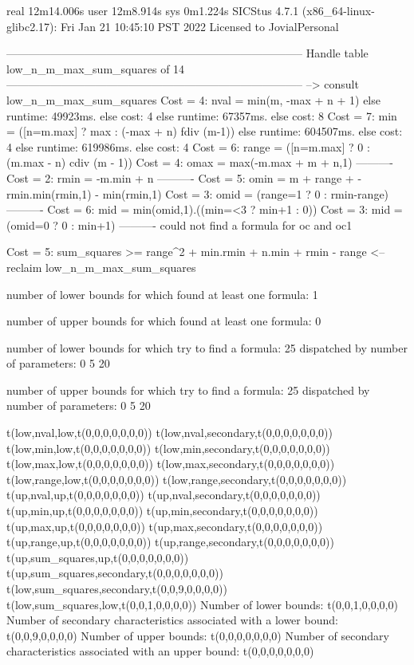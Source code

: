 real	12m14.006s
user	12m8.914s
sys	0m1.224s
SICStus 4.7.1 (x86_64-linux-glibc2.17): Fri Jan 21 10:45:10 PST 2022
Licensed to JovialPersonal


--------------------------------------------------------------------------------
Handle table low_n_m_max_sum_squares of 14
--------------------------------------------------------------------------------
--> consult low_n_m_max_sum_squares
Cost =  4:  nval  = min(m, -max + n + 1) %
else runtime: 49923ms. else cost: 4
else runtime: 67357ms. else cost: 8
Cost =  7:  min   = ([n=m.max] ? max : (-max + n) fdiv (m-1)) %
else runtime: 604507ms. else cost: 4
else runtime: 619986ms. else cost: 4
Cost =  6:  range = ([n=m.max] ? 0 : (m.max - n) cdiv (m - 1)) %
Cost =  4:  omax  = max(-m.max + m + n,1)
----------
Cost =  2:  rmin  = -m.min + n
----------
Cost =  5:  omin  = m + range + -rmin.min(rmin,1) - min(rmin,1) %
Cost =  3:  omid  = (range=1 ? 0 : rmin-range)
----------
Cost =  6:  mid   = min(omid,1).((min=<3 ? min+1 : 0)) %
Cost =  3:  mid   = (omid=0 ? 0 : min+1)
----------
could not find a formula for oc and oc1

Cost =  5:  sum_squares >= range^2 + min.rmin + n.min + rmin - range
<-- reclaim low_n_m_max_sum_squares

number of lower bounds for which found at least one formula: 1

number of upper bounds for which found at least one formula: 0

number of lower bounds for which try to find a formula: 25
dispatched by number of parameters: 0  5  20

number of upper bounds for which try to find a formula: 25
dispatched by number of parameters: 0  5  20

t(low,nval,low,t(0,0,0,0,0,0,0))
t(low,nval,secondary,t(0,0,0,0,0,0,0))
t(low,min,low,t(0,0,0,0,0,0,0))
t(low,min,secondary,t(0,0,0,0,0,0,0))
t(low,max,low,t(0,0,0,0,0,0,0))
t(low,max,secondary,t(0,0,0,0,0,0,0))
t(low,range,low,t(0,0,0,0,0,0,0))
t(low,range,secondary,t(0,0,0,0,0,0,0))
t(up,nval,up,t(0,0,0,0,0,0,0))
t(up,nval,secondary,t(0,0,0,0,0,0,0))
t(up,min,up,t(0,0,0,0,0,0,0))
t(up,min,secondary,t(0,0,0,0,0,0,0))
t(up,max,up,t(0,0,0,0,0,0,0))
t(up,max,secondary,t(0,0,0,0,0,0,0))
t(up,range,up,t(0,0,0,0,0,0,0))
t(up,range,secondary,t(0,0,0,0,0,0,0))
t(up,sum_squares,up,t(0,0,0,0,0,0,0))
t(up,sum_squares,secondary,t(0,0,0,0,0,0,0))
t(low,sum_squares,secondary,t(0,0,9,0,0,0,0))
t(low,sum_squares,low,t(0,0,1,0,0,0,0))
Number of lower bounds:                                             t(0,0,1,0,0,0,0)
Number of secondary characteristics associated with a lower bound:  t(0,0,9,0,0,0,0)
Number of upper bounds:                                             t(0,0,0,0,0,0,0)
Number of secondary characteristics associated with an upper bound: t(0,0,0,0,0,0,0)

